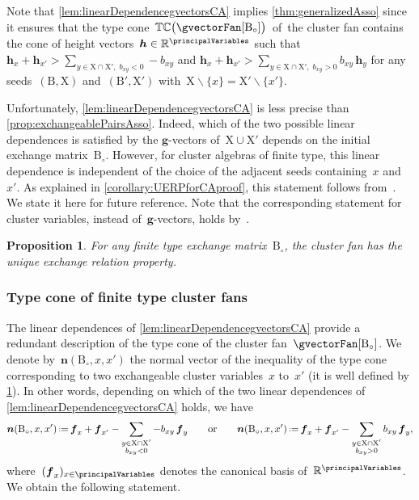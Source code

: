 \documentclass{amsart}
\newtheorem{proposition}[theorem]{Proposition}
\theoremstyle{definition}
\newcommand{\R}{\mathbb{R}} %
\renewcommand{\b}[1]{{\boldsymbol{#1}}} %
\newcommand{\ssm}{\smallsetminus} %
\newcommand{\eqdef}{\mbox{\,\raisebox{0.2ex}{\scriptsize\ensuremath{\mathrm:}}\ensuremath{=}\,}} %
\newcommand{\typeCone}{\mathbb{TC}} %
\newcommand{\cluster}{\mathrm{X}} %
\newcommand{\B}{\mathrm{B}} %
\begin{document}
Note that \cref{lem:linearDependencegvectorsCA} implies \cref{thm:generalizedAsso} since it ensures that the type cone~$\typeCone \big( \gvectorFan[\B_\circ] \big)$~of~the cluster fan contains the cone of height vectors~${\b{h} \in \R^{\principalVariables}}$ such that
\(
\b{h}_x + \b{h}_{x'} > \sum_{{y \in \cluster \cap \cluster', \; b_{xy} < 0}} -b_{xy}
\)
and
\(
\b{h}_x + \b{h}_{x'} > \sum_{{y \in \cluster \cap \cluster', \; b_{xy} > 0}} b_{xy} \, \b{h}_y
\)
for any seeds~$(\B, \cluster)$ and~$(\B', \cluster')$ with~${\cluster \ssm \{x\} = \cluster' \ssm \{x'\}}$.

Unfortunately, \cref{lem:linearDependencegvectorsCA} is less precise than \cref{prop:exchangeablePairsAsso}. Indeed, which of the two possible linear dependences is satisfied by the $\b{g}$-vectors of~$\cluster \cup \cluster'$ depends on the initial exchange matrix~$\B_\circ$.
However, for cluster algebras of finite type, this linear dependence is independent of the choice of the adjacent seeds containing~$x$ and~$x'$.
As explained in \cref{corollary:UERPforCAproof}, this statement follows from~\cite[Thm.~7.5]{BuanMarshReinekeReitenTodorov}.
We state it here for future reference.
Note that the corresponding statement for cluster variables, instead of~$\b{g}$-vectors, holds by~\cite[Thm.~1.11]{FominZelevinsky-ClusterAlgebrasII}.

\begin{proposition}
\label{prop:uniqueExchangePropertyCA}
For any finite type exchange matrix~$\B_\circ$, the cluster fan has the unique exchange relation property.
\end{proposition}


\subsubsection{Type cone of finite type cluster fans}

The linear dependences of \cref{lem:linearDependencegvectorsCA} provide a redundant description of the type cone of the cluster fan~$\gvectorFan[\B_\circ]$.
We denote by~$\b{n}(\B_\circ, x, x')$ the normal vector of the inequality of the type cone corresponding to two exchangeable cluster variables~$x$ to~$x'$ (it is well defined by \cref{prop:uniqueExchangePropertyCA}).
In other words, depending on which of the two linear dependences of \cref{lem:linearDependencegvectorsCA} holds, we have
\[
\b{n}(\B_\circ, x, x') \eqdef \b{f}_x + \b{f}_{x'} - \sum_{\substack{y \in \cluster \cap \cluster' \\ b_{xy} < 0}} -b_{xy} \, \b{f}_y
\qquad\text{or}\qquad
\b{n}(\B_\circ, x, x') \eqdef \b{f}_x + \b{f}_{x'} - \sum_{\substack{y \in \cluster \cap \cluster' \\ b_{xy} > 0}} b_{xy} \, \b{f}_y,
\]
where~$(\b{f}_x)_{x \in \principalVariables}$ denotes the canonical basis of~$\R^{\principalVariables}$.
We obtain the following statement.
\end{document}
